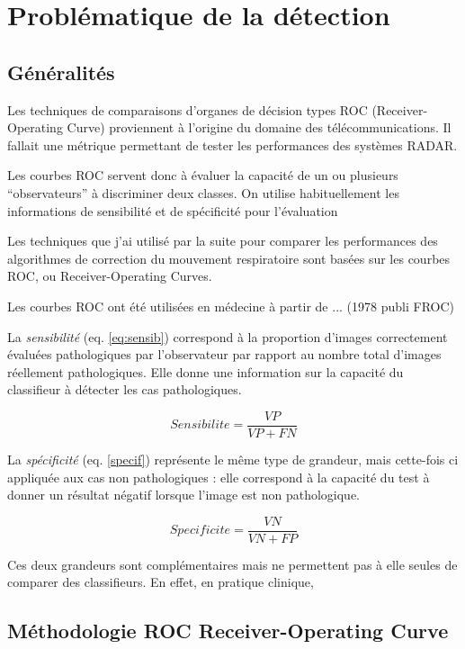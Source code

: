 \chapter{Problématique de la détection}
	\section{Généralités}

Les techniques de comparaisons d'organes de décision types ROC (Receiver-Operating Curve) proviennent à l'origine du domaine des télécommunications. Il fallait une métrique permettant de tester les performances des systèmes RADAR\cite{zou2007receiver}. 

Les courbes ROC servent donc à évaluer la capacité de un ou plusieurs ``observateurs'' à discriminer deux classes. On utilise habituellement les informations de sensibilité et de spécificité pour l'évaluation

Les techniques que j'ai utilisé par la suite pour comparer les performances des algorithmes de correction du mouvement respiratoire sont basées sur les courbes ROC, ou Receiver-Operating Curves.

Les courbes ROC ont été utilisées en médecine à partir de ... (1978 publi FROC)

La \emph{sensibilité} (eq. \ref{eq:sensib}) correspond à la proportion d'images correctement évaluées pathologiques par l'observateur par rapport au nombre total d'images réellement pathologiques. Elle donne une information sur la capacité du classifieur à détecter les cas pathologiques.

\begin{equation}
	\label{eq:sensib}
	Sensibilite = \frac{VP}{VP + FN}
\end{equation}

La \emph{spécificité} (eq. \ref{specif}) représente le même type de grandeur, mais cette-fois ci appliquée aux cas non pathologiques : elle correspond à la capacité du test à donner un résultat négatif lorsque l'image est non pathologique.

\begin{equation}
	\label{eq:specif}
	Specificite = \frac{VN}{VN + FP}
\end{equation}

Ces deux grandeurs sont complémentaires mais ne permettent pas à elle seules de comparer des classifieurs. En effet, en pratique clinique, 

	\section{Méthodologie ROC Receiver-Operating Curve}

